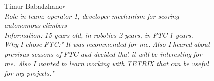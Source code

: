 	\vfill 
	\begin{figure}[H]
	\begin{minipage}[h]{0.47\linewidth}
		Timur Babadzhanov\\
		\emph{Role in team: operator-1,  developer mechanism for scoring autonomous climbers\\ }
		\emph{Information: 15 years old, in robotics 2 years, in FTC 1 years. \\ } 
		\emph{Why I chose FTC:" It was recommended for me. Also I heared about previous seasons of FTC and decided that it will be interesting for me. Also I wanted to learn working with TETRIX that can be useful for my projects."}					
	\end{minipage}
	\hfill
	\begin{minipage}[h]{0.47\linewidth}
		\\
	\end{minipage}
\end{figure}
\hfill

